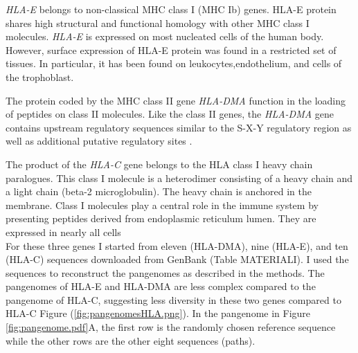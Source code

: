 \textit{HLA-E} belongs to non-classical MHC class I (MHC Ib) genes. HLA-E protein shares high structural and functional homology with other MHC class I molecules. \textit{HLA-E} is expressed on most nucleated cells of the human body. However, surface expression of HLA-E protein was found in a restricted set of tissues. In particular, it has been found on leukocytes,endothelium, and cells of the trophoblast\cite{kanevskiy2019dimorphism}.

The protein coded by the MHC class II gene \textit{HLA-DMA} function in the loading of peptides on class II molecules. Like the class II genes, the \textit{HLA-DMA} gene contains upstream regulatory sequences similar to the S-X-Y regulatory region as well as additional putative regulatory sites \cite{westerheide1997hla}.

The product of the \textit{HLA-C} gene belongs to the HLA class I heavy chain paralogues. This class I molecule is a heterodimer consisting of a heavy chain and a light chain (beta-2 microglobulin). The heavy chain is anchored in the membrane. Class I molecules play a central role in the immune system by presenting peptides derived from endoplasmic reticulum lumen. They are expressed in nearly all cells\cite{HLA-C}\\

For these three genes I started from eleven (HLA-DMA), nine (HLA-E), and ten (HLA-C) sequences downloaded from GenBank (Table MATERIALI). I used the sequences to reconstruct the pangenomes as described in the methods. The pangenomes of HLA-E and HLA-DMA are less complex compared to the pangenome of HLA-C, suggesting less diversity in these two genes compared to HLA-C Figure (\ref{fig:pangenomesHLA.png}).  In the pangenome in Figure \ref{fig:pangenome.pdf}A, the first row is the randomly chosen reference sequence while the other rows are the other eight sequences (paths).
 
